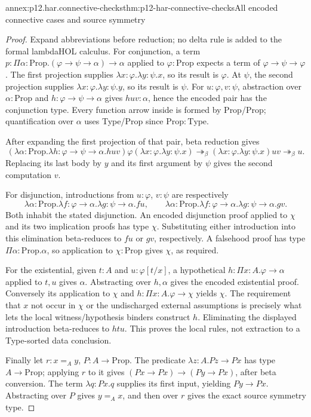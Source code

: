 \begin{annexitem}{annex:p12.har.connective-checks}{thm:p12-har-connective-checks}{All encoded connective cases and source symmetry}
\begin{proof}
Expand abbreviations before reduction; no delta rule is added to the
formal lambdaHOL calculus. For conjunction, a term
\(p:\Pi\alpha:\mathrm{Prop}.(\varphi\to\psi\to\alpha)\to\alpha\)
applied to \(\varphi:\mathrm{Prop}\) expects a term of
\(\varphi\to\psi\to\varphi\). The first projection supplies
\(\lambda x:\varphi.\lambda y:\psi.x\), so its result is
\(\varphi\). At \(\psi\), the second projection supplies
\(\lambda x:\varphi.\lambda y:\psi.y\), so its result is
\(\psi\). For \(u:\varphi,v:\psi\), abstraction over
\(\alpha:\mathrm{Prop}\) and
\(h:\varphi\to\psi\to\alpha\) gives \(huv:\alpha\),
hence the encoded pair has the conjunction type. Every function arrow
inside is formed by Prop/Prop; quantification over \(\alpha\) uses
Type/Prop since \(\mathrm{Prop}:\mathrm{Type}\).

After expanding the first projection of that pair, beta reduction gives
\[
 (\lambda\alpha:\mathrm{Prop}.
  \lambda h:\varphi\to\psi\to\alpha.huv)
       \varphi(\lambda x:\varphi.\lambda y:\psi.x)
 \twoheadrightarrow_\beta
 (\lambda x:\varphi.\lambda y:\psi.x)uv
 \twoheadrightarrow_\beta u.
\]
Replacing its last body by \(y\) and its first argument by \(\psi\)
gives the second computation \(v\).

For disjunction, introductions from \(u:\varphi\), \(v:\psi\)
are respectively
\[
 \lambda\alpha:\mathrm{Prop}.
 \lambda f:\varphi\to\alpha.\lambda g:\psi\to\alpha.fu,
 \qquad
 \lambda\alpha:\mathrm{Prop}.
 \lambda f:\varphi\to\alpha.\lambda g:\psi\to\alpha.gv.
\]
Both inhabit the stated disjunction. An encoded disjunction proof
applied to \(\chi\) and its two implication proofs has type
\(\chi\). Substituting either introduction into this elimination
beta-reduces to \(fu\) or \(gv\), respectively. A falsehood proof
has type \(\Pi\alpha:\mathrm{Prop}.\alpha\), so application to
\(\chi:\mathrm{Prop}\) gives \(\chi\), as required.

For the existential, given \(t:A\) and
\(u:\varphi[t/x]\), a hypothetical
\(h:\Pi x:A.\varphi\to\alpha\) applied to \(t,u\) gives
\(\alpha\). Abstracting over \(h,\alpha\) gives the encoded
existential proof. Conversely its application to \(\chi\) and
\(h:\Pi x:A.\varphi\to\chi\) yields \(\chi\).
The requirement that \(x\) not occur in \(\chi\) or the
undischarged external assumptions is precisely what lets the local
witness/hypothesis binders construct \(h\). Eliminating the displayed
introduction beta-reduces to \(htu\). This proves the local rules,
not extraction to a Type-sorted data conclusion.

Finally let \(r:x=_A y\), \(P:A\to\mathrm{Prop}\).
The predicate \(\lambda z:A.Pz\to Px\) has type
\(A\to\mathrm{Prop}\); applying \(r\) to it gives
\((Px\to Px)\to(Py\to Px)\), after beta conversion.
The term \(\lambda q:Px.q\) supplies its first input, yielding
\(Py\to Px\). Abstracting over \(P\) gives \(y=_A x\),
and then over \(r\) gives the exact source symmetry type.
\end{proof}
\end{annexitem}

